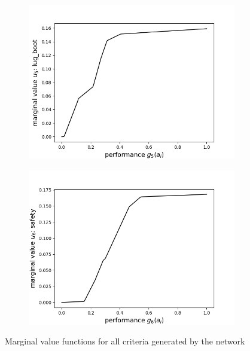 \documentclass[../main.tex]{subfiles}
\begin{document}
\begin{figure}[H]
    \begin{subfigure}[b]{0.48\linewidth}
        \includegraphics[width=\linewidth]{../img/marginal4.png}
    \end{subfigure}
    \begin{subfigure}[b]{0.48\linewidth}
        \includegraphics[width=\linewidth]{../img/marginal5.png}
    \end{subfigure}
    \caption{Marginal value functions for all criteria generated by the network}
\end{figure}
\end{document}
